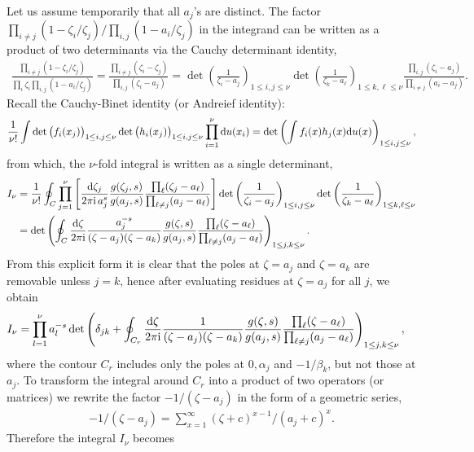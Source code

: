 \documentclass[cmp]{svjour}
\numberwithin{theorem}{section}
\numberwithin{equation}{section}
\def\dd{{\rm d}}
\def\ii{{\rm i}}
\begin{document}
Let us assume temporarily that all $a_j$'s are distinct.
The factor $\prod_{i\neq j} (1-\zeta_i/\zeta_j)/\prod_{i,j}(1-a_i/\zeta_j)$ in the integrand can be written as a product of two determinants via the Cauchy determinant identity, 
\begin{align*}
\frac{\prod_{i\neq j} (1-\zeta_i/\zeta_j)}{\prod_i \zeta_i  \prod_{i,j}(1-a_i/\zeta_j)}
 =
\frac{\prod_{i\neq j} (\zeta_i-\zeta_j)}{\prod_{i,j}(\zeta_i-a_j)}
=
\det\left(\frac{1}{\zeta_i-a_j}\right)_{1\le i,j\le \nu}
\det\left(\frac{1}{\zeta_k-a_\ell}\right)_{1\le k,\ell\le \nu}
\frac{\prod_{i,j}(\zeta_i-a_j)}{\prod_{i\neq j }(a_i-a_j)} .
\end{align*}
Recall the Cauchy-Binet identity (or Andreief identity):
\begin{equation*}
\frac{1}{\nu!}\int
\det\big(f_i(x_j)\big)_{1\le i,j\le \nu}
\det\big(h_i(x_j)\big)_{1\le i,j\le \nu}
\prod_{i=1}^\nu\dd u(x_i)
=
\det\left(\int f_i(x)h_j(x)\dd u(x)\right)_{1\le i,j\le \nu},
\end{equation*}
from which, the $\nu$-fold integral is written as a single determinant,
\begin{align*}
I_\nu
&=
\frac{1}{\nu!} \oint_C \prod_{j=1}^\nu \left[
\frac{\dd \zeta_j}{2\pi\ii\, a_j^s}
\frac{g(\zeta_j,s )}{g(a_j,s)}
\frac{\prod_{\ell}(\zeta_j-a_\ell)}{\prod_{ \ell\neq j}(a_j-a_\ell)} \right]
\det\left(\frac{1}{\zeta_i-a_j}\right)_{1\le i,j\le \nu}
\det\left(\frac{1}{\zeta_k-a_\ell}\right)_{1\le k, \ell \le \nu}
\\
&=
\det\left( \oint_C
\frac{\dd \zeta}{2\pi\ii}
\frac{a_j^{-s}}{(\zeta-a_j)(\zeta-a_k)} \frac{g(\zeta,s)}{g(a_j,s)}
\frac{\prod_{\ell} (\zeta-a_\ell)}{\prod_{\ell\neq j} (a_j-a_\ell)}
\right)_{1\le j,k\le \nu}.
 \end{align*}
From this explicit form it is clear that the poles at $\zeta=a_j$ and $\zeta=a_k$ are removable unless $j=k$, hence after evaluating residues at $\zeta=a_j$ for all $j$, we obtain
\begin{align}
I_\nu
&=\prod_{l=1}^{\nu}a_l^{-s}
\det\left(
\delta_{jk}+
\oint_{C_r}
\frac{\dd \zeta}{2\pi\ii}
\frac{1}{(\zeta-a_j)(\zeta-a_k)}
\frac{g(\zeta,s)}{g(a_j,s)}
\frac{\prod_{\ell} (\zeta-a_\ell)}{\prod_{\ell\neq j} (a_j-a_\ell)}
\right)_{1\le j,k\le \nu},
\label{prefredholm}
\end{align}
where the contour $C_r$ includes only the poles at $0, \alpha_j$ and $-1/\beta_k$, but not those at $a_j$. To transform the integral around $C_r$ into a product of two operators (or matrices)  we rewrite the factor $-1/(\zeta-a_j)$ in the form of a geometric series,
\begin{align}
-1/(\zeta-a_j) = \sum_{x=1}^{\infty} (\zeta + c  )^{x-1} /(a_j + c )^x.
\label{eq:cintro}
\end{align}
Therefore the integral $I_\nu$ becomes
\end{document}
